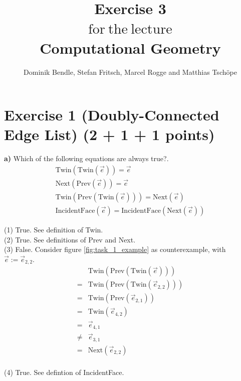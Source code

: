 \documentclass[english, fontsize=12pt, paper=a4, twoside=false, draft=true, pagesize=auto, version=last, DIV=16]{scrartcl}
\theoremstyle{break}
\begin{document}
\title{
\vspace*{-10mm}
Exercise 3 \\[-3pt]
{\Large $\mathrm{for \ the \ lecture}$} \\[-3pt]
{\LARGE \textbf{Computational Geometry}}
}
\author{Dominik Bendle, Stefan Fritsch, Marcel Rogge and Matthias Tschöpe}
\maketitle
\vspace*{-10mm}

\section*{Exercise 1 (Doubly-Connected Edge List) {\large \hfill (2 + 1 + 1 points)}}
\textbf{a)} Which of the following equations are always true?.
\begin{align}
\text{Twin}(\text{Twin}(\vec{e})) = \vec{e} \\
\text{Next}(\text{Prev}(\vec{e})) = \vec{e} \\
\text{Twin}(\text{Prev}(\text{Twin}(\vec{e}))) = \text{Next}(\vec{e}) \\
\text{IncidentFace}(\vec{e}) = \text{IncidentFace}(\text{Next}(\vec{e}))
\end{align} \par
\medskip
(1) True. See definition of Twin. \\
(2) True. See definitions of Prev and Next. \\
(3) False. Consider figure \ref{fig:task_1_example} as counterexample, with $\vec{e} := \vec{e}_{2,2}.$
\begin{align*}
&\text{Twin}(\text{Prev}(\text{Twin}(\vec{e}))) \\
= &\text{Twin}(\text{Prev}(\text{Twin}(\vec{e}_{2,2})))\\
= &\text{Twin}(\text{Prev}(\vec{e}_{2,1})) \\
= &\text{Twin}(\vec{e}_{4,2}) \\
= & \vec{e}_{4,1}\\
\neq & \vec{e}_{3,1}\\
= &\text{Next}(\vec{e}_{2,2}) \\
\end{align*}

(4) True. See defintion of IncidentFace. \\
\end{document}
